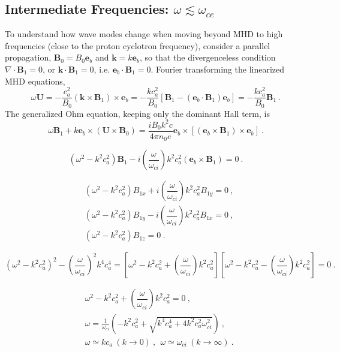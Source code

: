 \documentclass[12pt,a4paper]{article}
\renewcommand{\vec}[1]{\boldsymbol{#1}}
\begin{document}
 
\subsection{Intermediate Frequencies: $\omega \lesssim \omega_{ce}$}
To understand how wave modes change when moving beyond MHD to high frequencies (close to the proton cyclotron frequency), consider a parallel propagation, $\vec{B}_0 = B_0 \vec{e}_b$ and $\vec{k} = k \vec{e}_b$, so that the divergenceless condition $\nabla \cdot \vec{B}_1 = 0$, or $\vec{k} \cdot \vec{B}_1 = 0$, i.e. $\vec{e}_b \cdot \vec{B}_1 = 0$. Fourier transforming the linearized MHD equations,
\begin{equation*}
\omega \vec{U} = -\frac{c_a^2}{B_0} (\vec{k} \times \vec{B}_1) \times \vec{e}_b = -\frac{k c_a^2}{B_0} [\vec{B}_1 -(\vec{e}_b \cdot \vec{B}_1) \vec{e}_b] = -\frac{k c_a^2}{B_0} \vec{B}_1 ~.
\end{equation*}
The generalized Ohm equation, keeping only the dominant Hall term, is
\begin{equation*}
\omega \vec{B}_1 +k\vec{e}_b \times (\vec{U} \times \vec{B}_0) = \frac{i B_0 k^2 c}{4\pi n_0 e} \vec{e}_b \times [ (\vec{e}_b \times \vec{B}_1) \times \vec{e}_b] ~.
\end{equation*}

\begin{equation}
(\omega^2 -k^2 c_a^2) \vec{B}_1 -i \left(\dfrac{\omega}{\omega_{ci} } \right) k^2 c_a^2 (\vec{e}_b \times \vec{B}_1) = 0 ~.
\end{equation}


\begin{align}
& (\omega^2 -k^2 c_a^2) B_{1x} +i \left(\dfrac{\omega}{\omega_{ci} } \right) k^2 c_a^2 B_{1y} = 0 ~,\\
& (\omega^2 -k^2 c_a^2) B_{1y} -i \left(\dfrac{\omega}{\omega_{ci} } \right) k^2 c_a^2 B_{1x} = 0 ~,\\
& (\omega^2 -k^2 c_a^2) B_{1z} = 0 ~.
\end{align}

\begin{equation*}
(\omega^2 -k^2 c_a^2)^2 -\left(\dfrac{\omega}{\omega_{ci} } \right)^2 k^4 c_a^4 = \left[\omega^2 -k^2 c_a^2 + \left(\dfrac{\omega}{\omega_{ci} } \right) k^2 c_a^2 \right] \left[\omega^2 -k^2 c_a^2 - \left(\dfrac{\omega}{\omega_{ci} } \right) k^2 c_a^2  \right] = 0 ~.
\end{equation*}

\begin{align*}
& \omega^2 -k^2 c_a^2 + \left(\dfrac{\omega}{\omega_{ci} } \right) k^2 c_a^2 = 0 ~, \\
& \omega = \frac{1}{\omega_{ci} } \left(-k^2 c_a^2 +\sqrt{k^4 c_a^4 +4k^2 c_a^2 \omega_{ci}^2 } \right) ~,\\
& \omega \simeq k c_a ~(k \rightarrow 0) ~, ~~ \omega \simeq \omega_{ci} ~(k \rightarrow \infty) ~.
\end{align*}
\end{document}
